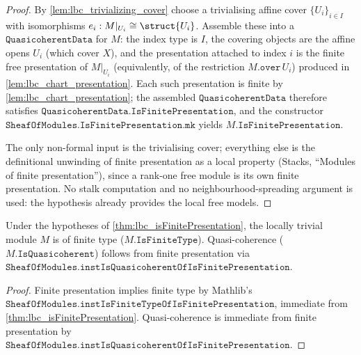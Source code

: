 \begin{proof}
  \leanok
  By \cref{lem:lbc_trivializing_cover} choose a trivialising affine cover
  \(\{U_i\}_{i \in I}\) with isomorphisms \(e_i : M|_{U_i} \cong \struct{U_i}\).
  Assemble these into a \(\mathtt{QuasicoherentData}\) for \(M\): the index type
  is \(I\), the covering objects are the affine opens \(U_i\) (which cover \(X\)),
  and the presentation attached to index \(i\) is the finite free presentation of
  \(M|_{U_i}\) (equivalently, of the restriction \(M.\mathtt{over}\,U_i\))
  produced in \cref{lem:lbc_chart_presentation}. Each such presentation is
  finite by \cref{lem:lbc_chart_presentation}; the assembled
  \(\mathtt{QuasicoherentData}\) therefore satisfies
  \(\mathtt{QuasicoherentData.IsFinitePresentation}\), and the constructor
  \(\mathtt{SheafOfModules.IsFinitePresentation.mk}\) yields
  \(M.\mathtt{IsFinitePresentation}\).

  The only non-formal input is the trivialising cover; everything else is the
  definitional unwinding of finite presentation as a local property
  (Stacks, ``Modules of finite presentation''), since a rank-one free module is its own finite
  presentation. No stalk computation and no neighbourhood-spreading argument is
  used: the hypothesis already provides the local free models.
\end{proof}

\begin{corollary}\leanok
  \label{cor:lbc_isFiniteType}
  Under the hypotheses of \cref{thm:lbc_isFinitePresentation}, the locally
  trivial module \(M\) is of finite type (\(M.\mathtt{IsFiniteType}\)). Quasi-coherence
  (\(M.\mathtt{IsQuasicoherent}\)) follows from finite presentation via
  \(\mathtt{SheafOfModules.instIsQuasicoherentOfIsFinitePresentation}\).
\end{corollary}

\begin{proof}
  \leanok
  Finite presentation implies finite type by Mathlib's
  \(\mathtt{SheafOfModules.instIsFiniteTypeOfIsFinitePresentation}\), immediate
  from \cref{thm:lbc_isFinitePresentation}. Quasi-coherence is immediate from
  finite presentation by
  \(\mathtt{SheafOfModules.instIsQuasicoherentOfIsFinitePresentation}\).
\end{proof}

